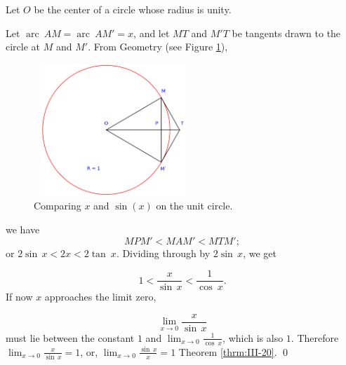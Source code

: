 Let $O$ be the center of a circle whose radius is unity.

Let $\operatorname{arc}\ AM = \operatorname{arc}\ AM' = x$, and let 
$MT$ and $M'T$ 
be tangents drawn to the circle at $M$ and $M'$. From Geometry 
(see Figure \ref{fig:limit-proof}), %

\begin{figure}[h!]
\begin{minipage}{\textwidth}
\begin{center}
\includegraphics[height=5cm,width=6cm]{circle-tangent.eps}
\end{center}
\end{minipage}
\caption{Comparing $x$ and $\sin(x)$ on the unit circle.}
\label{fig:limit-proof}
\end{figure}


\noindent
we have %
\[
MPM' < MAM' < MTM';
\]
or $2 \sin\, x < 2x < 2 \tan\ x$.
Dividing through by $2 \sin\, x$, we get

\[
    1 < \frac{x}{\sin\, x} < \frac{1}{\cos\ x}.
\]
If now $x$ approaches the limit zero,

\[
    \lim_{x \to 0} \frac{x}{\sin\, x}
\]
must lie between the constant $1$ and $\lim_{x \to 0} \frac{1}{\cos\ x}$, which is also $1$.
Therefore $\lim_{x \to 0} \frac{x}{\sin\, x} = 1$, or, 
$\lim_{x \to 0} \frac{\sin\, x}{x} = 1$ Theorem \ref{thrm:III-20}.
\qed

